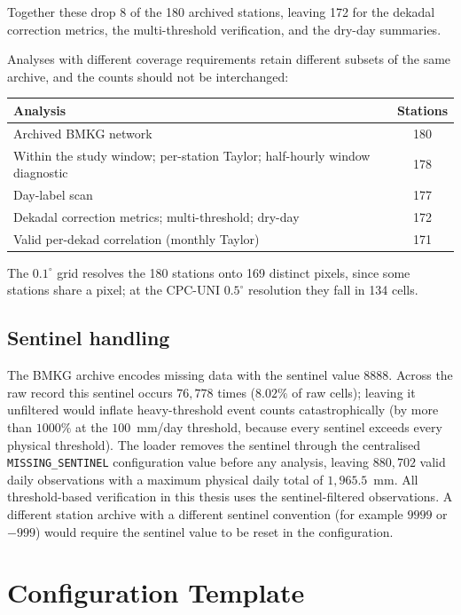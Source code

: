 Together these drop 8 of the 180 archived stations, leaving 172 for
the dekadal correction metrics, the multi-threshold verification,
and the dry-day summaries.

Analyses with different coverage requirements retain different
subsets of the same archive, and the counts should not be
interchanged:

\begin{center}
\begin{tabular}{lc}
\toprule
Analysis & Stations \\
\midrule
Archived BMKG network & 180 \\
Within the study window; per-station Taylor; half-hourly window diagnostic & 178 \\
Day-label scan & 177 \\
Dekadal correction metrics; multi-threshold; dry-day & 172 \\
Valid per-dekad correlation (monthly Taylor) & 171 \\
\bottomrule
\end{tabular}
\end{center}

\noindent
The $0.1^{\circ}$ grid resolves the 180 stations onto 169 distinct
pixels, since some stations share a pixel; at the CPC-UNI
$0.5^{\circ}$ resolution they fall in 134 cells.

\section{Sentinel handling}

The BMKG archive encodes missing data with the sentinel value
$8888$. Across the raw record this sentinel occurs $76{,}778$
times ($8.02\%$ of raw cells); leaving it unfiltered would inflate
heavy-threshold event counts catastrophically (by more than
$1000\%$ at the $100$~mm/day threshold, because every sentinel
exceeds every physical threshold). The loader removes the sentinel
through the centralised \texttt{MISSING\_SENTINEL} configuration
value before any analysis, leaving $880{,}702$ valid daily
observations with a maximum physical daily total of $1{,}965.5$~mm.
All threshold-based verification in this thesis uses the
sentinel-filtered observations. A different station archive with a
different sentinel convention (for example $9999$ or $-999$) would
require the sentinel value to be reset in the configuration.


\chapter{Configuration Template}\label{app:config}

